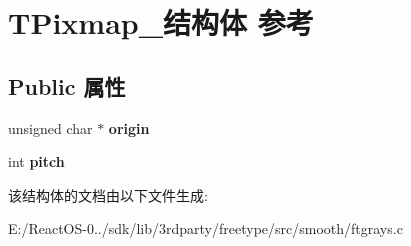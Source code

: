 \hypertarget{struct_t_pixmap__}{}\section{T\+Pixmap\+\_\+结构体 参考}
\label{struct_t_pixmap__}
\subsection*{Public 属性}
\begin{DoxyCompactItemize}
\item 
\mbox{\label{struct_t_pixmap___aad84432c325db80a2240c668c37455dd}} 
unsigned char $\ast$ {\bfseries origin}
\item 
\mbox{\label{struct_t_pixmap___a1457bea67a5b4d50da8f9f610a34f74b}} 
int {\bfseries pitch}
\end{DoxyCompactItemize}


该结构体的文档由以下文件生成\+:\begin{DoxyCompactItemize}
\item 
E\+:/\+React\+O\+S-\/0../sdk/lib/3rdparty/freetype/src/smooth/ftgrays.\+c\end{DoxyCompactItemize}

